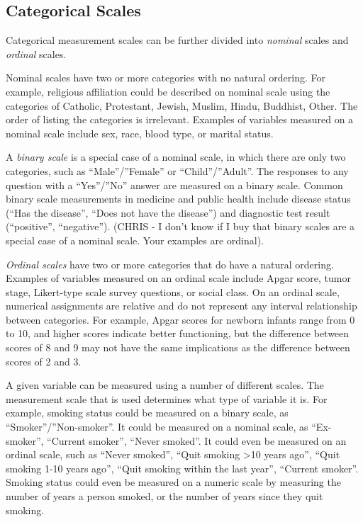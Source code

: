 \documentclass[
]{book}
\begin{document}
\hypertarget{categorical-scales}{%
\subsection{Categorical Scales}\label{categorical-scales}}

Categorical measurement scales can be further divided into \emph{nominal} scales and \emph{ordinal} scales.

Nominal scales have two or more categories with no natural ordering. For example, religious affiliation could be described on nominal scale using the categories of Catholic, Protestant, Jewish, Muslim, Hindu, Buddhist, Other. The order of listing the categories is irrelevant. Examples of variables measured on a nominal scale include sex, race, blood type, or marital status.

A \emph{binary scale} is a special case of a nominal scale, in which there are only two categories, such as ``Male''/''Female'' or ``Child''/''Adult''. The responses to any question with a ``Yes''/''No'' answer are measured on a binary scale. Common binary scale measurements in medicine and public health include disease status (``Has the disease'', ``Does not have the disease'') and diagnostic test result (``positive'', ``negative''). (CHRIS - I don't know if I buy that binary scales are a special case of a nominal scale. Your examples are ordinal).

\emph{Ordinal scales} have two or more categories that do have a natural ordering. Examples of variables measured on an ordinal scale include Apgar score, tumor stage, Likert-type scale survey questions, or social class. On an ordinal scale, numerical assignments are relative and do not represent any interval relationship between categories. For example, Apgar scores for newborn infants range from 0 to 10, and higher scores indicate better functioning, but the difference between scores of 8 and 9 may not have the same implications as the difference between scores of 2 and 3.

A given variable can be measured using a number of different scales. The measurement scale that is used determines what type of variable it is. For example, smoking status could be measured on a binary scale, as ``Smoker''/''Non-smoker''. It could be measured on a nominal scale, as ``Ex-smoker'', ``Current smoker'', ``Never smoked''. It could even be measured on an ordinal scale, such as ``Never smoked'', ``Quit smoking \textgreater10 years ago'', ``Quit smoking 1-10 years ago'', ``Quit smoking within the last year'', ``Current smoker''. Smoking status could even be measured on a numeric scale by measuring the number of years a person smoked, or the number of years since they quit smoking.
\end{document}
